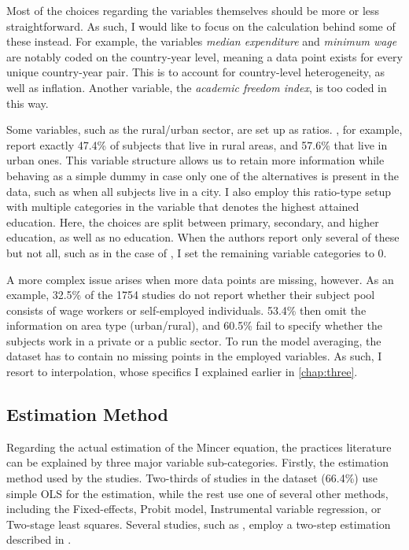 
Most of the choices regarding the variables themselves should be more or less straightforward. As such, I would like to focus on the calculation behind some of these instead. For example, the variables \textit{median expenditure} and \textit{minimum wage} are notably coded on the country-year level, meaning a data point exists for every unique country-year pair. This is to account for country-level heterogeneity, as well as inflation. Another variable, the \textit{academic freedom index}, is too coded in this way.

Some variables, such as the rural/urban sector, are set up as ratios. \cite{paweenawat2015private}, for example, report exactly 47.4\% of subjects that live in rural areas, and 57.6\% that live in urban ones. This variable structure allows us to retain more information while behaving as a simple dummy in case only one of the alternatives is present in the data, such as when all subjects live in a city. I also employ this ratio-type setup with multiple categories in the variable that denotes the highest attained education. Here, the choices are split between primary, secondary, and higher education, as well as no education. When the authors report only several of these but not all, such as in the case of \cite{chanis2021tell}, I set the remaining variable categories to 0.

A more complex issue arises when more data points are missing, however. As an example, 32.5\% of the 1754 studies do not report whether their subject pool consists of wage workers or self-employed individuals. 53.4\% then omit the information on area type (urban/rural), and 60.5\% fail to specify whether the subjects work in a private or a public sector. To run the model averaging, the dataset has to contain no missing points in the employed variables. As such, I resort to interpolation, whose specifics I explained earlier in \autoref{chap:three}.

\subsection{Estimation Method}
\label{subsec:estim_method}

Regarding the actual estimation of the Mincer equation, the practices literature can be explained by three major variable sub-categories. Firstly, the estimation method used by the studies. Two-thirds of studies in the dataset (66.4\%) use simple \ac{OLS} for the estimation, while the rest use one of several other methods, including the Fixed-effects, Probit model, Instrumental variable regression, or Two-stage least squares. Several studies, such as \cite{debrauw2008reconciling}, employ a two-step estimation described in \cite{heckman1974empirical}.

